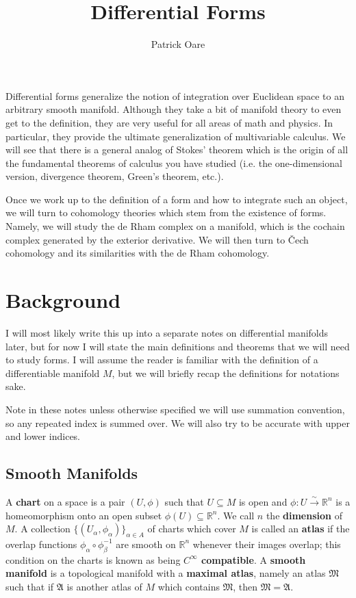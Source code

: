 \documentclass[11pt, oneside]{article}   	%
\title{Differential Forms}
\author{Patrick Oare}
\date{}							%
\theoremstyle{definition}
\begin{document}
\maketitle

Differential forms generalize the notion of integration over Euclidean space to an arbitrary smooth manifold. Although they take 
a bit of manifold theory to even get to the definition, they are very useful for all areas of math and physics. In particular, they 
provide the ultimate generalization of multivariable calculus. We will see that there is a general analog of Stokes' theorem which 
is the origin of all the fundamental theorems of calculus you have studied (i.e. the one-dimensional version, divergence theorem, 
Green's theorem, etc.). 

Once we work up to the definition of a form and how to integrate such an object, we will turn to cohomology theories which 
stem from the existence of forms. Namely, we will study the de Rham complex on a manifold, which is the cochain complex 
generated by the exterior derivative. We will then turn to \v{C}ech cohomology and its similarities with the de Rham 
cohomology. 

\section{Background}

I will most likely write this up into a separate notes on differential manifolds later, but for now I will state the main definitions 
and theorems that we will need to study forms. I will assume the reader is familiar with the definition of a differentiable 
manifold $M$, but we will briefly recap the definitions for notations sake. 

Note in these notes unless otherwise specified we will use summation convention, so any repeated index is summed over. 
We will also try to be accurate with upper and lower indices. 

\subsection{Smooth Manifolds}

A \textbf{chart} on a space is a pair $(U, \phi)$ 
such that $U\subseteq M$ is open and $\phi : U\xrightarrow{\sim}\mathbb R^n$ is a homeomorphism onto an open subset 
$\phi(U)\subseteq\mathbb R^n$. We call $n$ the 
\textbf{dimension} of $M$. A collection $\{(U_\alpha, \phi_\alpha)\}_{\alpha\in A}$ of charts which cover $M$ is called an 
\textbf{atlas} if the overlap functions $\phi_\alpha\circ\phi_\beta^{-1}$ are smooth on $\mathbb R^n$ whenever their images 
overlap; this condition on the charts is known as being \textbf{$C^\infty$ compatible}. A \textbf{smooth manifold} is a topological 
manifold with a \textbf{maximal atlas}, namely an atlas $\mathfrak M$ such that if $\mathfrak A$ is another atlas of $M$ which 
contains $\mathfrak M$, then $\mathfrak M = \mathfrak A$. 
\end{document}
